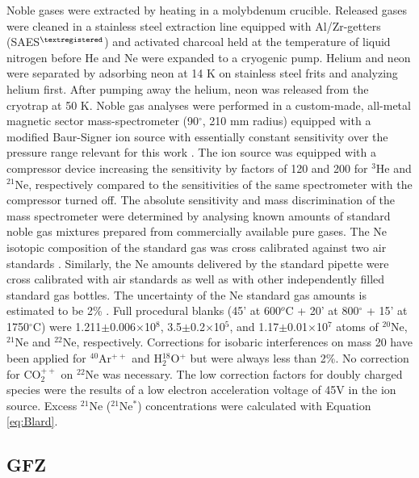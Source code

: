 \documentclass[authoryear,review,12pt]{elsarticle}
\begin{document}
Noble gases were extracted by heating in a molybdenum crucible.
Released gases were cleaned in a stainless steel extraction line
equipped with Al/Zr-getters (SAES$^{\tiny\textregistered}$) and
activated charcoal held at the temperature of liquid nitrogen before
He and Ne were expanded to a cryogenic pump. Helium and neon were
separated by adsorbing neon at 14 K on stainless steel frits and
analyzing helium first.  After pumping away the helium, neon was
released from the cryotrap at 50 K.  Noble gas analyses were performed
in a custom-made, all-metal magnetic sector mass-spectrometer
(90$^{\circ}$, 210 mm radius) equipped with a modified Baur-Signer ion
source with essentially constant sensitivity over the pressure range
relevant for this work \citep{baur1980}.  The ion source was equipped
with a compressor device increasing the sensitivity by factors of 120
and 200 for $^3$He and $^{21}$Ne, respectively \citep{baur1999}
compared to the sensitivities of the same spectrometer with the
compressor turned off.  The absolute sensitivity and mass
discrimination of the mass spectrometer were determined by analysing
known amounts of standard noble gas mixtures prepared from
commercially available pure gases. The Ne isotopic composition of the
standard gas was cross calibrated against two air standards
\citep{heber2009}. Similarly, the Ne amounts delivered by the standard
pipette were cross calibrated with air standards as well as with other
independently filled standard gas bottles. The uncertainty of the Ne
standard gas amounts is estimated to be 2\% \citep{heber2009}.  Full
procedural blanks (45' at 600$^{o}$C + 20' at 800$^{\circ}$ + 15' at
1750$^{\circ}$C) were 1.211$\pm$0.006$\times$10$^{8}$,
3.5$\pm$0.2$\times$10$^{5}$, and 1.17$\pm$0.01$\times$10$^{7}$ atoms
of $^{20}$Ne, $^{21}$Ne and $^{22}$Ne, respectively.  Corrections for
isobaric interferences on mass 20 have been applied for
$^{40}$Ar$^{++}$ and H$_2^{18}$O$^+$ but were always less than 2\%.
No correction for CO$_2^{++}$ on $^{22}$Ne was necessary.  The low
correction factors for doubly charged species were the results of a
low electron acceleration voltage of 45V in the ion source. Excess
$^{21}$Ne ($^{21}$Ne$^*$) concentrations were calculated with Equation
\ref{eq:Blard}.

\subsection{GFZ}
\end{document}

